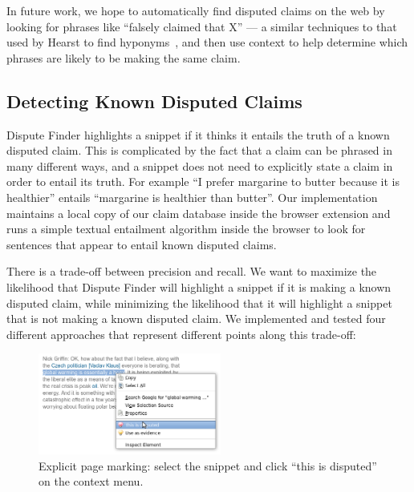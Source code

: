 \documentclass{www2010-accepted}
\newcommand{\todo}[1]{}
\begin{document}
In future work, we hope to automatically find disputed claims on the web by looking for phrases like ``falsely claimed that X'' --- a similar techniques to that used by Hearst to find hyponyms~\cite{Hearst1992}, and then use context to help determine which phrases are likely to be making the same claim.

\todo{Say how many disputed claims}
\todo{talk about duplicates}
\todo{Actually import the Politifact data}


\subsection{Detecting Known Disputed Claims}

Dispute Finder highlights a snippet if it thinks it entails the truth of a known disputed claim. This is complicated by the fact that a claim can be phrased in many different ways, and a snippet does not need to explicitly state a claim in order to entail its truth. For example ``I prefer margarine to butter because it is healthier'' entails ``margarine is healthier than butter''. Our implementation maintains a local copy of our claim database inside the browser extension and runs a simple textual entailment algorithm inside the browser to look for sentences that appear to entail known disputed claims. 

There is a trade-off between precision and recall. We want to maximize the likelihood that Dispute Finder will highlight a snippet if it is making a known disputed claim, while minimizing the likelihood that it will highlight a snippet that is not making a known disputed claim. We implemented and tested four different approaches that represent different points along this trade-off:

\begin{figure}[tb]
	\begin{center}
	\includegraphics[width=6cm]{pictures/mark_disputed.png}
	\caption{Explicit page marking: select the snippet and click ``this is disputed'' on the context menu.}
	\label{mark_disputed}
	\end{center}
\end{figure}
\end{document}

